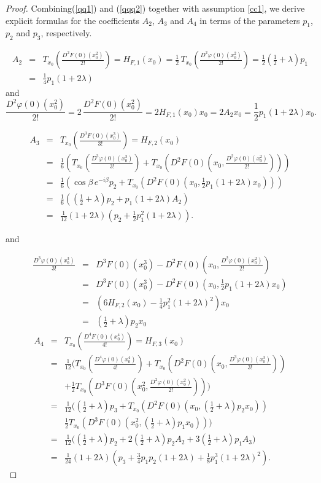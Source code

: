 \documentclass[10pt,a4paper]{amsart}
\newcommand{\bea}{\begin{eqnarray}}
\newcommand{\beas}{\begin{eqnarray*}}
\newcommand{\eea}{\end{eqnarray}}
\newcommand{\eeas}{\end{eqnarray*}}
\begin{document}
\begin{proof}
Combining(\ref{qq1}) and (\ref{qqq2}) together with assumption \eqref{cc1}, we derive explicit formulas for the coefficients \(A_2\), \(A_3\)  and \(A_4\) in terms of the parameters \(p_1\), \(p_2\) and  \(p_3\), respectively.


\bea\label{A2}A_2&=&T_{x_0}\!\left(\frac{D^2F(0)(x_0^2)}{2!}\right)=H_{F,1}(x_0)
=\frac{1}{2}\,T_{x_0}\!\left(\frac{D^2\varphi(0)(x_0^2)}{2!}\right)
=\frac{1}{2}\left(\frac{1}{2}+\lambda\right)p_1\nonumber\\
&=&\frac{1}{4}p_1(1+2\lambda)
\eea
and
\[
\frac{D^2\varphi(0)(x_0^2)}{2!}=2\,\frac{D^2F(0)(x_0^2)}{2!}=2H_{F,1}(x_0)x_0
=2A_2x_0
=\frac{1}{2}p_1(1+2\lambda)x_0.
\]

\bea\label{A3} A_3&=&T_{x_0}\!\left(\frac{D^3F(0)(x_0^3)}{3!}\right)
=H_{F,2}(x_0) \nonumber\\
&=&\frac{1}{6}\left(T_{x_0}\!\left(\frac{D^3\varphi(0)(x_0^3)}{3!}\right)
+T_{x_0}\!\left(D^2F(0)\!\left(x_0,\frac{D^2\varphi(0)(x_0^2)}{2!}\right)\right)\right) \nonumber\\
&=&\frac{1}{6}\left(\cos\beta\,e^{-i\beta}p_2+T_{x_0}\!\left(D^2F(0)(x_0,\frac{1}{2}p_1(1+2\lambda)x_0)\right)\right) \nonumber\\
&=&\frac{1}{6}\left(\left(\frac{1}{2}+\lambda\right)p_2+p_1(1+2\lambda)A_2\right)\nonumber\\
&=&\frac{1}{12}(1+2\lambda)\left(p_2+\frac{1}{2}p_1^2(1+2\lambda)\right).
\eea

and

\beas 
\frac{D^3\varphi(0)(x_0^3)}{3!}&=&D^3F(0)(x_0^3)-D^2F(0)\!\left(x_0,\frac{D^2\varphi(0)(x_0^2)}{2!}\right)\\
&=&D^3F(0)(x_0^3)-D^2F(0)(x_0,\frac{1}{2}p_1(1+2\lambda)x_0)\\
&=&\left(6H_{F,2}(x_0)-\frac{1}{4}p_1^2(1+2\lambda)^2\right)x_0\\
&=&\left(\frac{1}{2}+\lambda\right)p_2x_0\eeas
\bea\label{A4}
A_4&=& T_{x_0}\!\left(\frac{D^4F(0)(x_0^4)}{4!}\right)=H_{F,3}(x_0) \nonumber\\
&=&\frac{1}{12}\Bigg(T_{x_0}\!\left(\frac{D^4\varphi(0)(x_0^4)}{4!}\right)+T_{x_0}\!\left(D^2F(0)\!\left(x_0,\frac{D^3\varphi(0)(x_0^3)}{3!}\right)\right) \nonumber\\
&& +\frac{1}{2}T_{x_0}\!\left(D^3F(0)\!\left(x_0^2,\frac{D^2\varphi(0)(x_0^2)}{2!}\right)\right)\Bigg) \nonumber\\
&=&\frac{1}{12}\Bigg(\left(\frac{1}{2}+\lambda\right)p_3+
T_{x_0}\!\left(D^2F(0)(x_0,\left(\frac{1}{2}+\lambda\right)p_2x_0)\right) \nonumber\\
&&\frac{1}{2}T_{x_0}\!\left(D^3F(0)(x_0^2,\left(\frac{1}{2}+\lambda\right)p_1x_0)\right)\Bigg) \nonumber\\
&=&\frac{1}{12}\Bigg(\left(\frac{1}{2}+\lambda\right)p_2+2\left(\frac{1}{2}+\lambda\right)p_2A_2+3\left(\frac{1}{2}+\lambda\right)p_1A_3\Big) \nonumber\\
&=&\frac{1}{24}(1+2\lambda)\left(p_3+\frac{3}{4}p_1p_2(1+2\lambda)+\frac{1}{8}p_1^3(1+2\lambda)^2\right).\eea
\end{proof}
\end{document}
